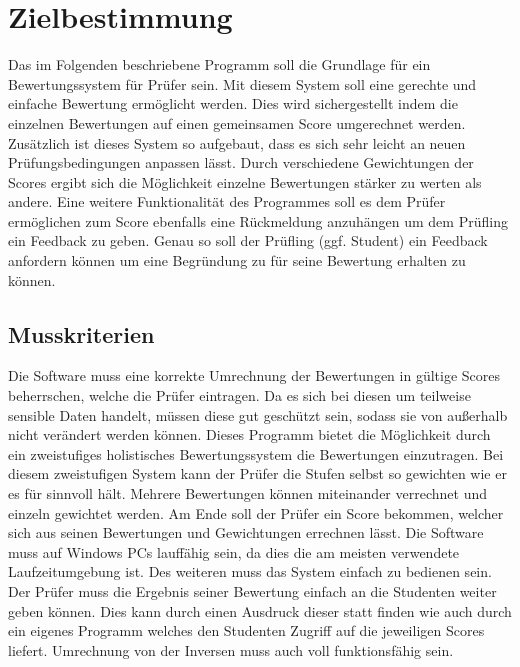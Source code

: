 \documentclass[a4paper,listof=leveldown,listof=numbered]{scrreprt}
\begin{document}
	
	
	\tableofcontents
	
\chapter{Zielbestimmung}
	Das im Folgenden beschriebene Programm soll die Grundlage für ein Bewertungssystem für Prüfer sein. Mit diesem System soll eine gerechte und einfache Bewertung ermöglicht werden. Dies wird sichergestellt indem die einzelnen Bewertungen auf einen gemeinsamen Score umgerechnet werden. Zusätzlich ist dieses System so aufgebaut, dass es sich sehr leicht an neuen Prüfungsbedingungen anpassen lässt. Durch verschiedene Gewichtungen der Scores ergibt sich die Möglichkeit einzelne Bewertungen stärker zu werten als andere. Eine weitere Funktionalität des Programmes soll es dem Prüfer ermöglichen zum Score ebenfalls eine Rückmeldung anzuhängen um dem Prüfling ein Feedback zu geben. Genau so soll der Prüfling (ggf. Student) ein Feedback anfordern können um eine Begründung zu für seine Bewertung erhalten zu können.
	
	\section{Musskriterien}
	Die Software muss eine korrekte Umrechnung der Bewertungen in gültige Scores beherrschen, welche die Prüfer eintragen. Da es sich bei diesen um teilweise sensible Daten handelt, müssen diese gut geschützt sein, sodass sie von außerhalb nicht verändert werden können. Dieses Programm bietet die Möglichkeit durch ein zweistufiges holistisches Bewertungssystem die Bewertungen einzutragen. Bei diesem zweistufigen System kann der Prüfer die Stufen selbst so gewichten wie er es für sinnvoll hält. Mehrere Bewertungen können miteinander verrechnet und einzeln gewichtet werden. Am Ende soll der Prüfer ein Score bekommen, welcher sich aus seinen Bewertungen und Gewichtungen errechnen lässt. Die Software muss auf Windows PCs lauffähig sein, da dies die am meisten verwendete Laufzeitumgebung ist. Des weiteren muss das System einfach zu bedienen sein. Der Prüfer muss die Ergebnis seiner Bewertung einfach an die Studenten weiter geben können. Dies kann durch einen Ausdruck dieser statt finden wie auch durch ein eigenes Programm welches den Studenten Zugriff auf die jeweiligen Scores liefert. Umrechnung von der Inversen muss auch voll funktionsfähig sein. 
	
\end{document}
